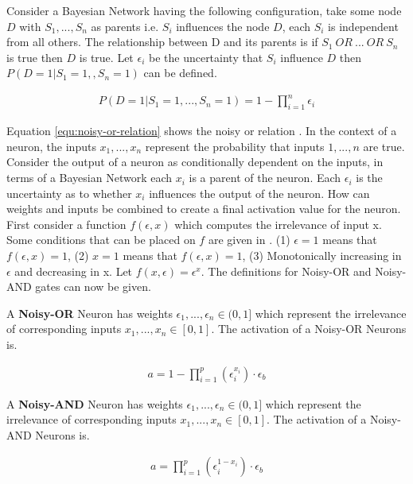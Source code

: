 Consider a Bayesian Network having the following configuration, take some node $D$ with $S_1,..., S_n$ as parents i.e. $S_i$ influences the node $D$, each $S_i$ is independent from all others. The relationship between D and its parents is if $S_1\ OR\ ...\ OR\ S_n$ is true then $D$ is true. Let $\epsilon_i$ be the uncertainty that $S_i$ influence $D$ then $P(D = 1| S_1 = 1, , S_n = 1)$ can be defined.

\begin{align}
P(D = 1 | S_1 = 1, ..., S_n = 1) = 1 - \prod^n_{i=1} \epsilon_i
\label{equ:noisy-or-relation}
\end{align}

Equation \ref{equ:noisy-or-relation} shows the noisy or relation \cite{LearningLogicalActivations}. In the context of a neuron, the inputs $x_1, ..., x_n$ represent the probability that inputs $1, ..., n$ are true. Consider the output of a neuron as conditionally dependent on the inputs, in terms of a Bayesian Network each $x_i$ is a parent of the neuron. Each $\epsilon_i$ is the uncertainty as to whether $x_i$ influences the output of the neuron. How can weights and inputs be combined to create a final activation value for the neuron. First consider a function $f(\epsilon, x)$ which computes the irrelevance of input x. Some conditions that can be placed on $f$ are given in \cite{LearningLogicalActivations}. (1) $\epsilon = 1$ means that $f(\epsilon, x) = 1$, (2) $x = 1$ means that $f(\epsilon, x) = 1$, (3) Monotonically increasing in $\epsilon$ and decreasing in x. Let $f(x, \epsilon) = \epsilon^x$. The definitions for Noisy-OR and Noisy-AND gates can now be given.

\begin{definition}
A \textbf{Noisy-OR} Neuron has weights $\epsilon_1, ..., \epsilon_n \in (0,1]$ which represent the irrelevance of corresponding inputs $x_1, ..., x_n \in [0,1]$. The activation of a Noisy-OR Neurons is.

\begin{align}
a = 1 - \prod^p_{i=1} (\epsilon_i^{x_i}) \cdot \epsilon_b
\label{equ:noisy-or-activation-1}
\end{align}
\end{definition}

\begin{definition}
A \textbf{Noisy-AND} Neuron has weights $\epsilon_1, ..., \epsilon_n \in (0, 1]$ which represent the irrelevance of corresponding inputs $x_1, ..., x_n \in [0,1]$. The activation of a Noisy-AND Neurons is.

\begin{align}
a = \prod^p_{i=1} (\epsilon_i^{1 - x_i}) \cdot \epsilon_b
\label{equ:noisy-and-activation-1}
\end{align}
\end{definition}


